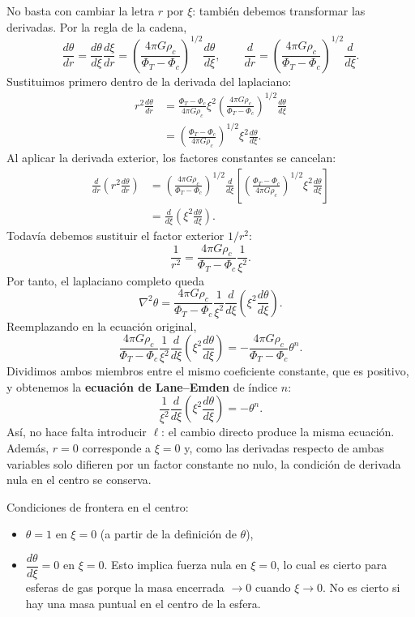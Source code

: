 No basta con cambiar la letra $r$ por $\xi$: también debemos transformar las derivadas. Por la regla de la cadena,
$$
\frac{d\theta}{dr}
=\frac{d\theta}{d\xi}\frac{d\xi}{dr}
=\left(\frac{4\pi G\rho_c}{\Phi_T-\Phi_c}\right)^{1/2}
\frac{d\theta}{d\xi},
\qquad
\frac{d}{dr}
=\left(\frac{4\pi G\rho_c}{\Phi_T-\Phi_c}\right)^{1/2}\frac{d}{d\xi}.
$$
Sustituimos primero dentro de la derivada del laplaciano:
$$
\begin{aligned}
r^2\frac{d\theta}{dr}
&=\frac{\Phi_T-\Phi_c}{4\pi G\rho_c}\xi^2
\left(\frac{4\pi G\rho_c}{\Phi_T-\Phi_c}\right)^{1/2}
\frac{d\theta}{d\xi}\\
&=\left(\frac{\Phi_T-\Phi_c}{4\pi G\rho_c}\right)^{1/2}
\xi^2\frac{d\theta}{d\xi}.
\end{aligned}
$$
Al aplicar la derivada exterior, los factores constantes se cancelan:
$$
\begin{aligned}
\frac{d}{dr}\left(r^2\frac{d\theta}{dr}\right)
&=\left(\frac{4\pi G\rho_c}{\Phi_T-\Phi_c}\right)^{1/2}
\frac{d}{d\xi}\left[
\left(\frac{\Phi_T-\Phi_c}{4\pi G\rho_c}\right)^{1/2}
\xi^2\frac{d\theta}{d\xi}\right]\\
&=\frac{d}{d\xi}\left(\xi^2\frac{d\theta}{d\xi}\right).
\end{aligned}
$$
Todavía debemos sustituir el factor exterior $1/r^2$:
$$
\frac{1}{r^2}=\frac{4\pi G\rho_c}{\Phi_T-\Phi_c}\frac{1}{\xi^2}.
$$
Por tanto, el laplaciano completo queda
$$
\nabla^2\theta
=\frac{4\pi G\rho_c}{\Phi_T-\Phi_c}
\frac{1}{\xi^2}\frac{d}{d\xi}
\left(\xi^2\frac{d\theta}{d\xi}\right).
$$
Reemplazando en la ecuación original,
$$
\frac{4\pi G\rho_c}{\Phi_T-\Phi_c}
\frac{1}{\xi^2}\frac{d}{d\xi}\left(\xi^2\frac{d\theta}{d\xi}\right)
=-\frac{4\pi G\rho_c}{\Phi_T-\Phi_c}\theta^n.
$$
Dividimos ambos miembros entre el mismo coeficiente constante, que es positivo, y obtenemos la \textbf{ecuación de Lane--Emden} de índice $n$:
$$
\boxed{\frac{1}{\xi^2}\frac{d}{d\xi}
\left(\xi^2\frac{d\theta}{d\xi}\right)=-\theta^n}.
$$
Así, no hace falta introducir $\ell$: el cambio directo produce la misma ecuación. Además, $r=0$ corresponde a $\xi=0$ y, como las derivadas respecto de ambas variables solo difieren por un factor constante no nulo, la condición de derivada nula en el centro se conserva.

Condiciones de frontera en el centro:

\begin{itemize}
\item $\theta = 1$ en $\xi = 0$ (a partir de la definición de $\theta$),
\item $\dfrac{d\theta}{d\xi} = 0$ en $\xi = 0$. Esto implica fuerza nula en $\xi = 0$, lo cual es cierto para esferas de gas porque la masa encerrada $\to 0$ cuando $\xi \to 0$. No es cierto si hay una masa puntual en el centro de la esfera.
\end{itemize}

